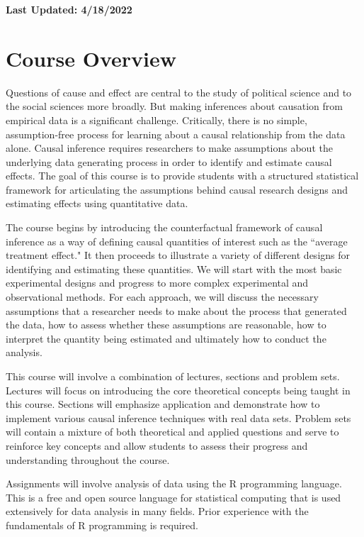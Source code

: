 \documentclass[11pt, article, oneside]{memoir}
\title{{\mytitle}}
\author{\myauthor\smallskip\footnotesize\newline Office: Pick Hall 328, 3rd floor
  \newline Office Hours: Tuesdays 1pm-3pm or schedule an appointment by e-mail \newline
    \myemail \newline \mywebsite
\newline \newline
Teaching Assistant: Arthur Yu\newline
Office Hours: 10:30am-12:30am Fridays (Pick Hall 312) \newline
\texttt{\href{mailto:arthurzeyangyu@uchicago.edu}{arthurzeyangyu@uchicago.edu}}
}
\date{}
\theoremstyle{Assumption}
\begin{document}
\maketitle
\textbf{Last Updated: 4/18/2022}
\section*{Course Overview}

Questions of cause and effect are central to the study of political science and to the social sciences more broadly. But making inferences about causation from empirical data is a significant challenge. Critically, there is no simple, assumption-free process for learning about a causal relationship from the data alone. Causal inference requires researchers to make assumptions about the underlying data generating process in order to identify and estimate causal effects. The goal of this course is to provide students with a structured statistical framework for articulating the assumptions behind causal research designs and estimating effects using quantitative data. 

The course begins by introducing the counterfactual framework of causal inference as a way of defining causal quantities of interest such as the ``average treatment effect." It then proceeds to illustrate a variety of different designs for identifying and estimating these quantities. We will start with the most basic experimental designs and progress to more complex experimental and observational methods. For each approach, we will discuss the necessary assumptions that a researcher needs to make about the process that generated the data, how to assess whether these assumptions are reasonable, how to interpret the quantity being estimated and ultimately how to conduct the analysis. 

This course will involve a combination of lectures, sections and problem sets. Lectures will focus on introducing the core theoretical concepts being taught in this course. Sections will emphasize application and demonstrate how to implement various causal inference techniques with real data sets. Problem sets will contain a mixture of both theoretical and applied questions and serve to reinforce key concepts and allow students to assess their progress and understanding throughout the course.

Assignments will involve analysis of data using the R programming language. This is a free and open source language for statistical computing that is used extensively for data analysis in many fields. Prior experience with the fundamentals of R programming is required.
\end{document}
